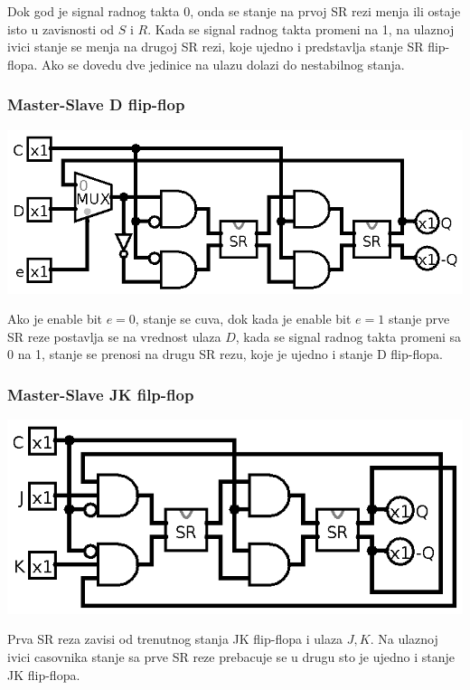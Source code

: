 \documentclass[12p,a4paper]{article}
\begin{document}
\begin{multicols}{2}
    Dok god je signal radnog takta 0, onda se stanje na prvoj SR rezi menja 
    ili ostaje isto u zavisnosti od $S$ i $R$. Kada se signal radnog takta
    promeni na 1, na ulaznoj ivici stanje se menja na drugoj SR rezi, koje
    ujedno i predstavlja stanje SR flip-flopa. Ako se dovedu dve jedinice na
    ulazu dolazi do nestabilnog stanja.

    \subsubsection{Master-Slave D flip-flop}

    \includegraphics[width=0.9\columnwidth]{Figures/d_ms_flipflop.png}

    Ako je enable bit $e = 0$, stanje se cuva, dok kada je enable bit 
    $e = 1$ stanje prve SR reze postavlja se na vrednost ulaza $D$, kada se
    signal radnog takta promeni sa 0 na 1, stanje se prenosi na drugu SR rezu,
    koje je ujedno i stanje D flip-flopa.

    \subsubsection{Master-Slave JK filp-flop}

    \includegraphics[width=0.9\columnwidth]{Figures/jk_ms_flipflop.png}

    Prva SR reza zavisi od trenutnog stanja JK flip-flopa i ulaza $J, K$. Na
    ulaznoj ivici casovnika stanje sa prve SR reze prebacuje se u drugu sto je
    ujedno i stanje JK flip-flopa.


\end{multicols}
\end{document}
